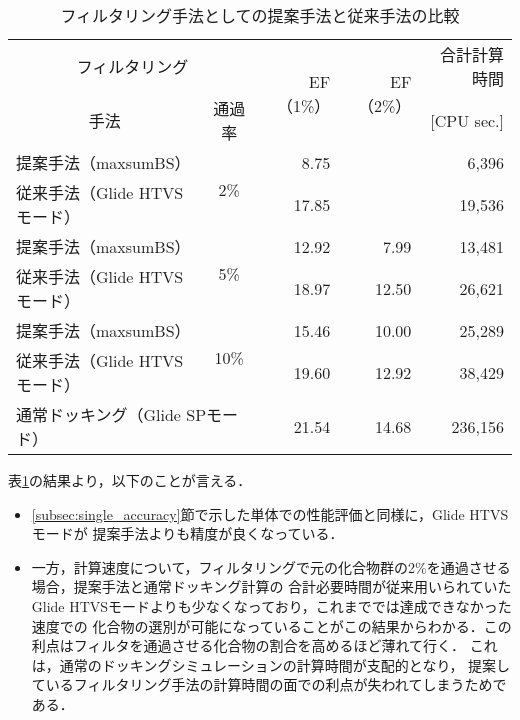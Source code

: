 \begin{table}[htb] \centering
	\caption{フィルタリング手法としての提案手法と従来手法の比較}
	\label{table:filtering_proposal_Glide}
	\begin{tabular}{lc|rr|r}
	\hline
	\multicolumn{2}{c|}{フィルタリング}					&\multirow{2}{*}{EF（1\%）}	&\multirow{2}{*}{EF（2\%）}	&合計計算時間	\\
	\multicolumn{1}{c}{手法}		&通過率				&						&						&[CPU sec.]		\\ \hline
	提案手法（maxsumBS）		&\multirow{2}{*}{2\%}	&8.75					&\textendash				&6,396			\\
	従来手法（Glide HTVSモード）	&					&17.85					&\textendash				&19,536			\\
	提案手法（maxsumBS）		&\multirow{2}{*}{5\%}	&12.92					&7.99					&13,481			\\
	従来手法（Glide HTVSモード）	&					&18.97					&12.50					&26,621			\\
	提案手法（maxsumBS）		&\multirow{2}{*}{10\%}	&15.46					&10.00					&25,289			\\
	従来手法（Glide HTVSモード）	&					&19.60					&12.92					&38,429			\\ \hline
	\multicolumn{2}{l|}{通常ドッキング（Glide SPモード）}	&21.54					&14.68					&236,156			\\ \hline
	\end{tabular}
\end{table}

表\ref{table:filtering_proposal_Glide}の結果より，以下のことが言える．
\begin{itemize}
\item \ref{subsec:single_accuracy}節で示した単体での性能評価と同様に，Glide HTVSモードが
	提案手法よりも精度が良くなっている．
\item 一方，計算速度について，フィルタリングで元の化合物群の2\%を通過させる場合，提案手法と通常ドッキング計算の
	合計必要時間が従来用いられていたGlide HTVSモードよりも少なくなっており，これまででは達成できなかった速度での
	化合物の選別が可能になっていることがこの結果からわかる．この利点はフィルタを通過させる化合物の割合を高めるほど薄れて行く．
	これは，通常のドッキングシミュレーションの計算時間が支配的となり，
	提案しているフィルタリング手法の計算時間の面での利点が失われてしまうためである．
\end{itemize}